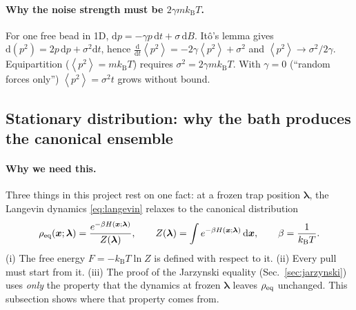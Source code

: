 \documentclass[11pt,a4paper]{article}
\newcommand{\kT}{k_{\mathrm B}T}
\newcommand{\dd}{\mathrm{d}}
\newcommand{\avg}[1]{\left\langle #1\right\rangle}
\newcommand{\lam}{\bm{\lambda}}
\begin{document}
\paragraph{Why the noise strength must be $2\gamma m\kT$.} For one free bead in 1D,
$\dd p=-\gamma p\,\dd t+\sigma\,\dd B$. It\^o's lemma gives $\dd(p^2)=2p\,\dd p+\sigma^2\dd t$, hence
$\tfrac{\dd}{\dd t}\avg{p^2}=-2\gamma\avg{p^2}+\sigma^2$ and $\avg{p^2}\to\sigma^2/2\gamma$.
Equipartition ($\avg{p^2}=m\kT$) requires $\sigma^2=2\gamma m\kT$. With $\gamma=0$ (``random
forces only'') $\avg{p^2}=\sigma^2t$ grows without bound.

\subsection{Stationary distribution: why the bath produces the canonical ensemble}
\label{sec:stationary}

\paragraph{Why we need this.} Three things in this project rest on one fact: at a frozen trap
position $\lam$, the Langevin dynamics \eqref{eq:langevin} relaxes to the canonical distribution
\begin{equation}
\rho_{\rm eq}(\bm x;\lam)=\frac{e^{-\beta H(\bm x;\lam)}}{Z(\lam)},\qquad
Z(\lam)=\int e^{-\beta H(\bm x;\lam)}\,\dd\bm x,\qquad\beta=\frac1{\kT}.
\label{eq:rhoeq}
\end{equation}
(i) The free energy $F=-\kT\ln Z$ is defined with respect to it. (ii) Every pull must start from it.
(iii) The proof of the Jarzynski equality (Sec.~\ref{sec:jarzynski}) uses \emph{only} the property
that the dynamics at frozen $\lam$ leaves $\rho_{\rm eq}$ unchanged. This subsection shows where that property comes from.
\end{document}
